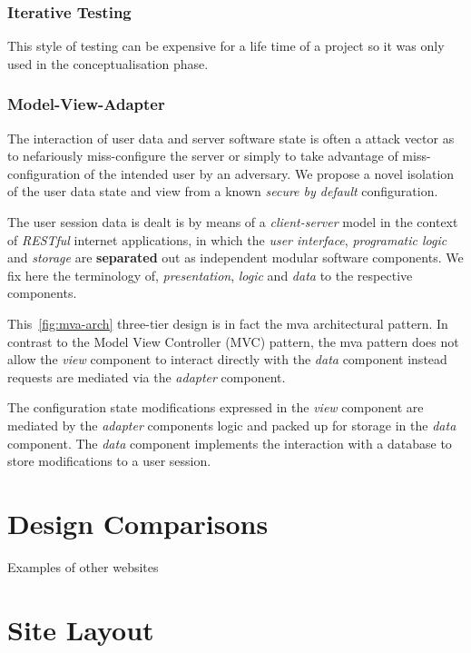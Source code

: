 \documentclass[letterpaper,12pt]{article}
\begin{document}
\subsubsection{Iterative Testing}

This style of testing can be expensive for a life time of a project so it was only used in the conceptualisation phase.

\subsubsection{Model-View-Adapter}

The interaction of user data and server software state is often a attack vector
as to nefariously miss-configure the server or simply to take advantage of
miss-configuration of the intended user by an adversary. We propose a novel
isolation of the user data state and view from a known \emph{secure by default}
configuration.

The user session data is dealt is by means of a \emph{client-server}
model in the context of \emph{RESTful} internet applications, in which
the \emph{user interface}, \emph{programatic logic}
and \emph{storage} are \textbf{separated} out as
independent modular software components. We fix here the terminology of,
\emph{presentation}, \emph{logic} and \emph{data} to the respective
components.



This~\ref{fig:mva-arch} three-tier design is in fact the \acrfull{mva} architectural pattern. In contrast to the Model View Controller (MVC)
pattern, the \acrshort{mva} pattern does not allow the \emph{view} component to interact
directly with the \emph{data} component instead requests are mediated via the
\emph{adapter} component.

The configuration state modifications expressed in the \emph{view} component
are mediated by the \emph{adapter} components logic and packed up for storage
in the \emph{data} component. The \emph{data} component implements the
interaction with a database to store modifications to a user session.

\section{Design Comparisons}

Examples of other websites

\section{Site Layout}
\end{document}
